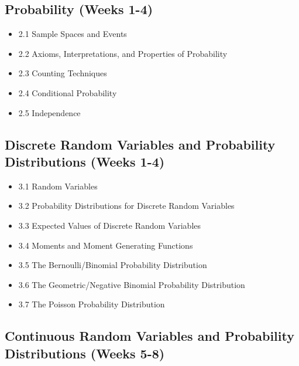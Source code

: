 \documentclass[]{book}
\providecommand{\tightlist}{%
  \setlength{\itemsep}{0pt}\setlength{\parskip}{0pt}}
\providecommand{\tightlist}{%
  \setlength{\itemsep}{0pt}\setlength{\parskip}{0pt}}
\theoremstyle{definition}
\theoremstyle{definition}
\theoremstyle{definition}
\theoremstyle{remark}
\begin{document}
\subsection*{Probability (Weeks 1-4)}\label{probability-weeks-1-4}

\begin{itemize}
\tightlist
\item
  2.1 Sample Spaces and Events
\item
  2.2 Axioms, Interpretations, and Properties of Probability
\item
  2.3 Counting Techniques
\item
  2.4 Conditional Probability
\item
  2.5 Independence
\end{itemize}

\subsection*{Discrete Random Variables and Probability Distributions
(Weeks
1-4)}\label{discrete-random-variables-and-probability-distributions-weeks-1-4}

\begin{itemize}
\tightlist
\item
  3.1 Random Variables
\item
  3.2 Probability Distributions for Discrete Random Variables
\item
  3.3 Expected Values of Discrete Random Variables
\item
  3.4 Moments and Moment Generating Functions
\item
  3.5 The Bernoulli/Binomial Probability Distribution
\item
  3.6 The Geometric/Negative Binomial Probability Distribution
\item
  3.7 The Poisson Probability Distribution
\end{itemize}

\subsection*{Continuous Random Variables and Probability Distributions
(Weeks
5-8)}\label{continuous-random-variables-and-probability-distributions-weeks-5-8}
\end{document}
